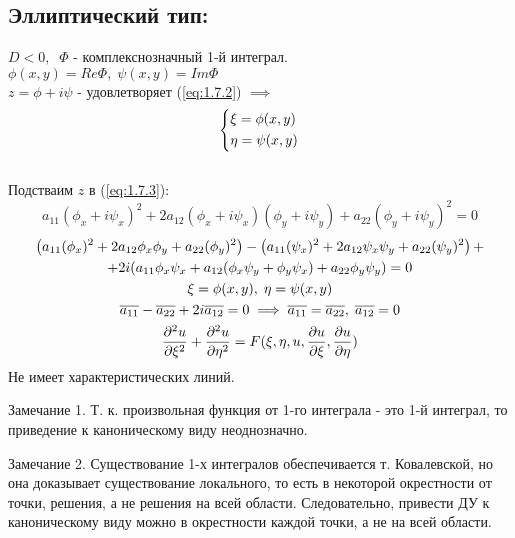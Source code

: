 \documentclass[../main.tex]{subfiles}
\begin{document}
\subsection*{Эллиптический тип:}
$D<0, \;\; \Phi$ - комплекснозначный 1-й интеграл. \\
$\phi(x,y) = Re\Phi, \; \psi(x,y) = Im\Phi$\\
$z = \phi + i\psi$ - удовлетворяет (\ref{eq:1.7.2}) $\implies$\\
$$\begin{dcases} \xi = \phi(x,y) \\ \eta = \psi(x,y) \end{dcases}$$\\
Подстваим $z$ в (\ref*{eq:1.7.3}):
\begin{equation}
	a_{11}(\phi_x+i\psi_x)^2 + 2a_{12}(\phi_x + i\psi_x)(\phi_y + i\psi_y) + a_{22}(\phi_y + i\psi_y)^2 = 0
\end{equation}
\begin{gather*}
\left(a_{11}(\phi_x)^2 + 2a_{12}\phi_x\phi_y + a_{22}(\phi_y)^2 \right) - \left(a_{11}(\psi_x)^2 + 2a_{12}\psi_x\psi_y + a_{22}(\psi_y)^2\right)+\\
 + 2i(a_{11}\phi_x\psi_x + a_{12}(\phi_x\psi_y + \phi_y\psi_x)+a_{22}\phi_y\psi_y)=0 \\
\xi = \phi(x,y),\; \eta = \psi(x,y)\\
\overline{a_{11}} - \overline{a{_{22}}} + 2i\overline{a_{12}} = 0 \implies
\overline{a_{11}}=\overline{a_{22}}, \; \overline{a_{12}}=0 \\
\frac{\partial^2u}{\partial{\xi^2}} + \frac{\partial^2u}{\partial{\eta^2}} = F(\xi, \eta, u, \frac{\partial u}{\partial \xi}, \frac{\partial u}{\partial \eta})\\
\end{gather*}
Не имеет характеристических линий.
\par Замечание 1. Т. к. произвольная функция от 1-го интеграла - это 1-й интеграл, то приведение к каноническому виду неоднозначно.
\par Замечание 2. Существование 1-х интегралов обеспечивается т. Ковалевской, но она доказывает существование локального, то есть в некоторой окрестности от точки, решения, а не решения на всей области. Следовательно, привести ДУ к каноническому виду можно в окрестности каждой точки, а не на всей области.
\end{document}
